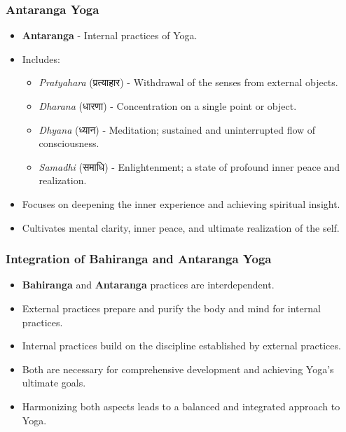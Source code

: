 \begin{frame}[fragile]\frametitle{Antaranga Yoga}

      \begin{itemize}
		\item \textbf{Antaranga} - Internal practices of Yoga.
		\item Includes:
		  \begin{itemize}
		      \item \textit{Pratyahara} (प्रत्याहार) - Withdrawal of the senses from external objects.
		      \item \textit{Dharana} (धारणा) - Concentration on a single point or object.
		      \item \textit{Dhyana} (ध्यान) - Meditation; sustained and uninterrupted flow of consciousness.
		      \item \textit{Samadhi} (समाधि) - Enlightenment; a state of profound inner peace and realization.
		  \end{itemize}
		\item Focuses on deepening the inner experience and achieving spiritual insight.
		\item Cultivates mental clarity, inner peace, and ultimate realization of the self.
	  \end{itemize}

\end{frame}

\begin{frame}[fragile]\frametitle{Integration of Bahiranga and Antaranga Yoga}

      \begin{itemize}
		\item \textbf{Bahiranga} and \textbf{Antaranga} practices are interdependent.
		\item External practices prepare and purify the body and mind for internal practices.
		\item Internal practices build on the discipline established by external practices.
		\item Both are necessary for comprehensive development and achieving Yoga’s ultimate goals.
		\item Harmonizing both aspects leads to a balanced and integrated approach to Yoga.
	  \end{itemize}

\end{frame}


